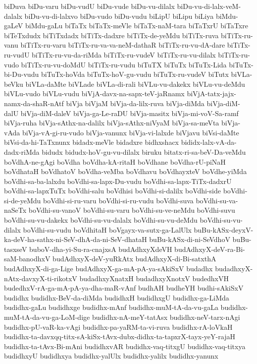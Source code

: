 {biDuva
biDu-varu
biDu-vudU
biDu-vude
biDu-vu-dilalx
biDu-vu-di-lalx-veM-dalalx
biDu-vu-di-lalxvo
biDu-vudo
biDu-vudu
biLipU
biLipu
biLiya
biMdu-gaLeV
biMdu-gaLu
biTaTx
biTaTx-meVle
biTaTx-naM-tara
biTaTxrU
biTaTxre
biTeTxdudx
biTiTxdadx
biTiTx-dadxre
biTiTx-de-yeMdu
biTiTx-ruva
biTiTx-ru-vanu
biTiTx-ru-varu
biTiTx-ru-va-va-neM-dathaR
biTiTx-ru-vu-dA-dare
biTiTx-ru-vudU
biTiTx-ru-vu-da-riMda
biTiTx-ru-vudeV
biTiTx-ru-vu-dilalx
biTiTx-ru-vudo
biTiTx-ru-vu-doMdU
biTiTx-ru-vudu
biTuTX
biTuTx
biTuTx-Lida
biTuTx-bi-Du-vudu
biTuTx-hoVda
biTuTx-hoV-gu-vudu
biTuTx-ru-vudeV
biTutx
biVLa-beVku
biVLa-daMte
biVLade
biVLa-di-rali
biVLu-vu-dakekx
biVLu-vu-deMdu
biVLu-vudo
biVLu-vudu
biVjA-davx-na-sapx-teV-jaRnamx
biVjA-tatx-jajx-namx-da-shaR-nAtf
biVja
biVjaM
biVja-da-lilx-ruva
biVja-diMda
biVja-diM-dalU
biVja-diM-daleV
biVja-ga-Le-raDU
biVja-masitx
biVja-mi-voV-Sa-ramf
biVja-ruha
biVja-sAthx-na-dalilx
biVja-sAthx-niVyaM
biVja-sa-meVta
biVja-vAda
biVja-vA-gi-ru-vudo
biVja-vanunx
biVja-vi-lalxde
biVjavu
biVsi-daMte
biVsi-da-hi-TaTxnunx
bidadx-meVle
bidadxre
bidhxshacx
bididx-lalx-vA-da-dadx-riMda
bidudx
bidudx-hoV-gu-vu-dilalx
biruku
bitatx-ri-sa-beV-Da-veMdu
boVdhA-ne-gAgi
boVdha
boVdha-kA-ritaH
boVdhane
boVdha-rU-piNaH
boVdhataH
boVdhatoV
boVdha-veMba
boVdhavu
boVdhayxteV
boVdhe-yiMda
boVdhi-sa-ba-lalxdu
boVdhi-sa-lapx-Du-vudu
boVdhi-sa-lapx-TiTx-dadxrU
boVdhi-sa-lapxTuTx
boVdhi-salu
boVdhisi
boVdhi-si-dalilx
boVdhi-side
boVdhi-si-de-yeMdu
boVdhi-si-ru-varu
boVdhi-si-ru-vudu
boVdhi-suva
boVdhi-su-va-naSeTx
boVdhi-su-vanoV
boVdhi-su-varu
boVdhi-su-ve-neMdu
boVdhi-suvu
boVdhi-su-vu-dakekx
boVdhi-su-vu-dalalx
boVdhi-su-vu-deMdu
boVdhi-su-vu-dilalx
boVdhi-su-vudu
boVdhitaH
boVgayx-va-sutx-ga-LalUlx
buBu-kASx-deyxV-ka-deV-ha-sathx-ni-SeV-dhA-da-ni-SeV-dhataH
buBu-kASx-di-ni-SeVdhoV
buBu-tasxseV
buboV-dha-yi-Su-ra-cnajxsA
budAdhxyXdeVH
budAdhxyX-deV-ra-Bi-saM-banodhxV
budAdhxyX-deV-yuRkAtx
budAdhxyX-di-Bi-satxthA
budAdhxyX-di-ga-Lige
budAdhxyX-ga-mA-pA-ya-sAkiSxV
budadhx
budadhxyX-nAtx-davxyX-ti-rikotxV
budadhxyXnatxH
budadhxyXnotxV
budedhxVH
budedhxV-rA-ga-mA-pA-ya-dha-maR-vAnf
budhAH
budheYH
budhi-sAkiSxV
budidhx
budidhx-BeV-da-diMda
budidhxH
budidhxgU
budidhx-ga-LiMda
budidhx-gaLu
budidhxge
budidhx-mAnf
budidhx-muM-tA-da-vu-gaLa
budidhx-muM-tA-da-vu-ga-LoM-dige
budidhx-nA-meY-tatAsx
budidhx-neV-tarx-nAgi
budidhx-pU-vaR-ka-vAgi
budidhx-pa-yaRM-ta-vi-ruva
budidhx-rA-loVkaH
budidhx-ta-davxqq-titx-sA-kiSx-tAvx-dubx-didhx-ta-tapxrX-tayx-yeY-rajaH
budidhx-ta-tAvx-Bi-mAni
budidhxvAR
budidhx-vaq-titxgU
budidhx-vaq-titxya
budidhxyU
budidhxya
budidhx-yalUlx
budidhx-yalilx
budidhx-yanunx
}
